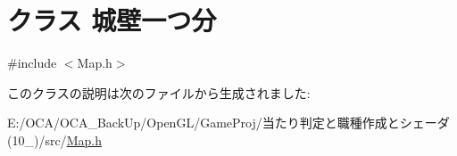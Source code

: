 \hypertarget{class_xE5_x9F_x8E_xE5_xA3_x81_xE4_xB8_x80_xE3_x81_xA4_xE5_x88_x86}{\section{クラス 城壁一つ分}
\label{class_xE5_x9F_x8E_xE5_xA3_x81_xE4_xB8_x80_xE3_x81_xA4_xE5_x88_x86}
}


{\ttfamily \#include $<$Map.\-h$>$}



このクラスの説明は次のファイルから生成されました\-:\begin{DoxyCompactItemize}
\item 
E\-:/\-O\-C\-A/\-O\-C\-A\-\_\-\-Back\-Up/\-Open\-G\-L/\-Game\-Proj/当たり判定と職種作成とシェーダ(10\-\_)/src/\hyperlink{_map_8h}{Map.\-h}\end{DoxyCompactItemize}
